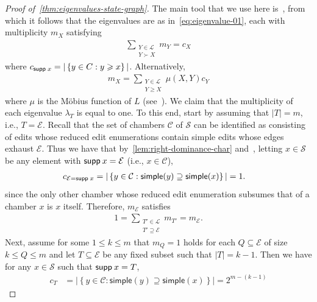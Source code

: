 \documentclass[11pt,a4paper]{article}
\newcommand{\supp}{{\mathsf{supp }\hspace{.075cm}}}
\newcommand{\simple}[1]{\mathrm{\mathsf{simple}}({#1})}
\begin{document}
\begin{proof}[Proof of~\cref{thm:eigenvalues-state-graph}]
    The main tool that we use here is~\cite[Thm. 1]{brownSemigroupsRingsMarkov2000}, from which it follows that the eigenvalues are as in~\cref{eq:eigenvalue-01}, each with multiplicity $m_X$ satisfying
        \begin{align*}
            \sum_{\substack{Y\in \mathcal{L}\\Y\succ X}} m_Y = c_X
        \end{align*}
    where $c_{\supp{x}}  = |\left\{y\in C: y\geqslant x\right\}|$. Alternatively,
        \begin{align*}
            m_X = \sum_{\substack{Y\in \mathcal{L}\\ Y\geq X}}\mu(X, Y)c_Y
        \end{align*}
    where $\mu$ is the M\"{o}bius function of $L$ (see~\cite[Sec. 3.7]{stanley2011enumerative}). We claim that the multiplicity of each eigenvalue $\lambda_T$ is equal to one. To this end, start by assuming that $|T| = {m}$, i.e., $T = {\mathcal{E}}$. Recall that the set of chambers $\mathcal{C}$ of $\mathcal{S}$ can be identified as consisting of edits whose reduced edit enumerations contain simple edits whose edges exhaust $\mathcal{E}$. Thus we have that by~\cref{lem:right-dominance-char} and~\cite[Thm. 1]{brownSemigroupsRingsMarkov2000}, letting $x\in\mathcal{S}$ be any element with $\supp{x} = \mathcal{E}$ (i.e., $x\in\mathcal{C}$),
        \begin{align*}
            c_{\mathcal{E}=\supp{x}} &= |\left\{y\in \mathcal{C}: \simple{y}\supseteq \simple{x}\right\}| = 1.
        \end{align*}
    since the only other chamber whose reduced edit enumeration subsumes that of a chamber $x$ is $x$ itself. Therefore, $m_\mathcal{E}$ satisfies
        \begin{align*}
            1 = \sum_{\substack{T'\in \mathcal{L} \\ T'\supseteq \mathcal{E}}} m_{T'} = m_\mathcal{E}.
        \end{align*}
    Next, assume for some $1\leq k\leq m$ that $m_Q = 1$ holds for each $Q\subseteq\mathcal{E}$ of size $k\leq Q\leq {m}$ and let $T\subseteq {\mathcal{E}}$ be any fixed subset such that $|T| = k-1$. Then we have for any $x\in \mathcal{S}$ such that $\supp x = T$,
        \begin{align*}
            c_T &= |\left\{y\in \mathcal{C}: \simple{y}\supseteq \simple{x}\right\}| =2^{{m} - (k-1)}
        \end{align*}

\end{proof}
\end{document}
